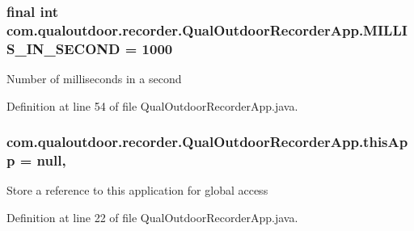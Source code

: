 \hypertarget{classcom_1_1qualoutdoor_1_1recorder_1_1QualOutdoorRecorderApp_a23686d98fcd161d744bd9ed2467562be}{
\subsubsection[{M\-I\-L\-L\-I\-S\-\_\-\-I\-N\-\_\-\-S\-E\-C\-O\-N\-D}]{\setlength{\rightskip}{0pt plus 5cm}final int com.\-qualoutdoor.\-recorder.\-Qual\-Outdoor\-Recorder\-App.\-M\-I\-L\-L\-I\-S\-\_\-\-I\-N\-\_\-\-S\-E\-C\-O\-N\-D = 1000\hspace{0.3cm}{\ttfamily [static]}}}\label{classcom_1_1qualoutdoor_1_1recorder_1_1QualOutdoorRecorderApp_a23686d98fcd161d744bd9ed2467562be}
Number of milliseconds in a second 

Definition at line 54 of file Qual\-Outdoor\-Recorder\-App.\-java.

\hypertarget{classcom_1_1qualoutdoor_1_1recorder_1_1QualOutdoorRecorderApp_a0b1a264b14ed9e6792ec501dead1678b}{
\subsubsection[{this\-App}]{ com.\-qualoutdoor.\-recorder.\-Qual\-Outdoor\-Recorder\-App.\-this\-App = null\hspace{0.3cm}{\ttfamily [static]}, {\ttfamily [private]}}}\label{classcom_1_1qualoutdoor_1_1recorder_1_1QualOutdoorRecorderApp_a0b1a264b14ed9e6792ec501dead1678b}
Store a reference to this application for global access 

Definition at line 22 of file Qual\-Outdoor\-Recorder\-App.\-java.

